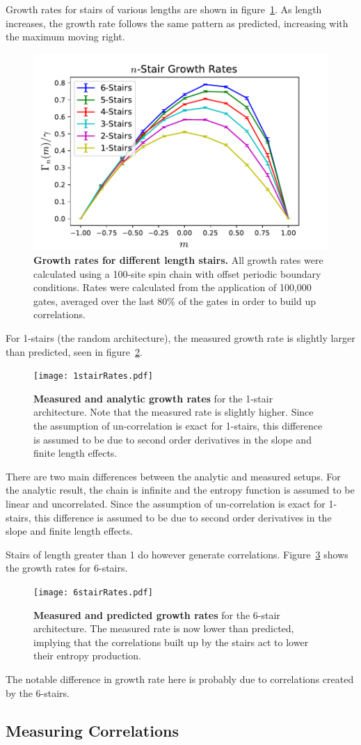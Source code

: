\documentclass[11pt]{article}
\begin{document}
Growth rates for stairs of various lengths are shown in figure~\ref{fig:compareRates}. As length increases, the growth rate follows the same pattern as predicted, increasing with the maximum moving right. 
\begin{figure}
	\centering
	\includegraphics[width=.5\textwidth]{compareRates.pdf}
	\caption{\textbf{Growth rates for different length stairs.} All growth rates were calculated using a 100-site spin chain with offset periodic boundary conditions. Rates were calculated from the application of 100,000 gates, averaged over the last 80\% of the gates in order to build up correlations.}
	\label{fig:compareRates}
\end{figure}

For 1-stairs (the random architecture), the measured growth rate is slightly larger than predicted, seen in figure~\ref{fig:1stairRates}.
\begin{figure}
	\centering
	\texttt{[image: 1stairRates.pdf]}
	\caption{\textbf{Measured and analytic growth rates} for the 1-stair architecture. Note that the measured rate is slightly higher. Since the assumption of un-correlation is exact for 1-stairs, this difference is assumed to be due to second order derivatives in the slope and finite length effects.}
	\label{fig:1stairRates}
\end{figure}
There are two main differences between the analytic and measured setups. For the analytic result, the chain is infinite and the entropy function is assumed to be linear and uncorrelated. Since the assumption of un-correlation is exact for 1-stairs, this difference is assumed to be due to second order derivatives in the slope and finite length effects.

Stairs of length greater than 1 do however generate correlations. Figure~\ref{6stairRates} shows the growth rates for 6-stairs. 
\begin{figure}
	\centering
	\texttt{[image: 6stairRates.pdf]}
	\caption{\textbf{Measured and predicted growth rates} for the 6-stair architecture. The measured rate is now lower than predicted, implying that the correlations built up by the stairs act to lower their entropy production.}
	\label{6stairRates}
\end{figure}
The notable difference in growth rate here is probably due to correlations created by the 6-stairs. 

\subsection{Measuring Correlations} \emph{} \label{sub:correlations}







\printbibliography
\end{document}
